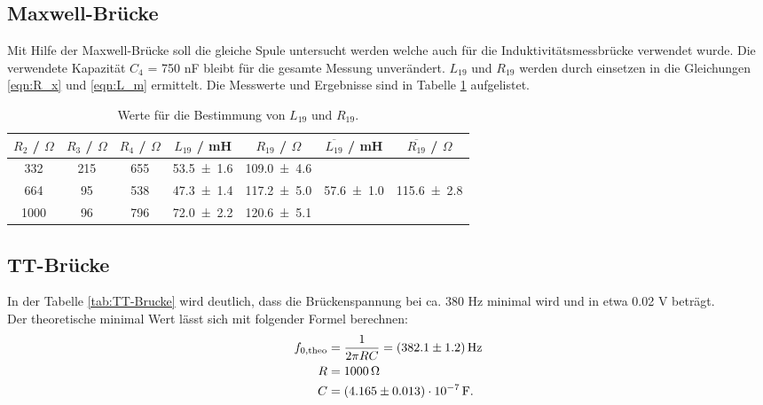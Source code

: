 \subsection{Maxwell-Brücke}
\label{sec:Maxwell}
Mit Hilfe der Maxwell-Brücke soll die gleiche Spule untersucht werden welche auch für die Induktivitätsmessbrücke verwendet wurde. Die verwendete Kapazität $C_4$ = 750 nF bleibt für die gesamte Messung unverändert. $L_{19}$ und $R_{19}$ werden durch einsetzen in die Gleichungen \ref{eqn:R_x} und \ref{eqn:L_m} ermittelt. Die Messwerte und Ergebnisse sind in Tabelle \ref{tab:Induk2} aufgelistet.

\begin{table}[H] %
  \centering
  \begin{tabular}{c c c c c c c}
    \toprule
    $R_2$ / $\Omega$ & $R_3$ / $\Omega$ & $R_4$ / $\Omega$ & $L_{19}$ / mH & $R_{19}$ / $\Omega$ & $\overline{L_{19}}$ / mH & $\overline{R_{19}}$ / $\Omega$ \\
    \midrule
    332 & 215 & 655 & \num{53.5 +- 1.6} & \num{109.0 +- 4.6} & & \\
    664 & 95 & 538 & \num{47.3 +- 1.4} & \num{117.2 +- 5.0} & \num{57.6 +- 1.0} & \num{115.6 +- 2.8} \\
    1000 & 96 & 796 & \num{72.0 +- 2.2} & \num{120.6 +- 5.1} & & \\
  \end{tabular}
  \caption{Werte für die Bestimmung von $L_{19}$ und $R_{19}$.}
  \label{tab:Induk2}
\end{table}

\subsection{TT-Brücke}
In der Tabelle \ref{tab:TT-Brucke} wird deutlich, dass die Brückenspannung bei ca. 380 Hz minimal wird und in etwa 0.02 V beträgt. \\
Der theoretische minimal Wert lässt sich mit folgender Formel berechnen:
\begin{align*}
  f_{0,\text{theo}} & = \frac{1}{2\pi RC} = (\num{382.1 +- 1.2}) \, \text{Hz} \\
  R & = 1000 \, \Omega \\
  C & = (\num{4.165 +- 0.013}) \cdot 10^{-7} \, \text{F}.
\end{align*}

